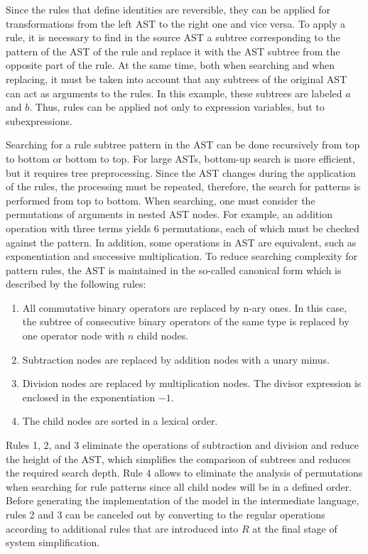 \documentclass[lettersize,journal]{IEEEtran}
\begin{document}
Since the rules that define identities are reversible, they can be applied for transformations from the left AST to the right one and vice versa. 
To apply a rule, it is necessary to find in the source AST a subtree corresponding to the pattern of the AST of the rule and replace it
with the AST subtree from the opposite part of the rule. At the same time, both when searching and when replacing, it must be taken into account that any subtrees 
of the original AST can act as arguments to the rules. In this example, these subtrees are labeled \(a\) and \(b\). Thus, rules can be applied not only to 
expression variables, but to subexpressions.

Searching for a rule subtree pattern in the AST can be done recursively from top to bottom or bottom to top. For large ASTs, bottom-up search is more efficient, 
but it requires tree preprocessing. Since the AST changes during the application of the rules, the processing must be repeated, therefore, 
the search for patterns is performed from top to bottom. When searching, one must consider the permutations of arguments in nested 
AST nodes. For example, an addition operation with three terms yields 6 permutations, each of which must be checked against the pattern. 
In addition, some operations in AST are equivalent, such as exponentiation and successive multiplication. 
To reduce searching complexity for pattern rules, the AST is maintained in the so-called canonical form which is described by the following rules:

\begin{enumerate}
	\item All commutative binary operators are replaced by n-ary ones. In this case, the subtree of consecutive binary operators of the same type is replaced by one operator node with \(n\) child nodes.
	\item Subtraction nodes are replaced by addition nodes with a unary minus.
	\item Division nodes are replaced by multiplication nodes. The divisor expression is enclosed in the exponentiation \(-1\).
	\item The child nodes are sorted in a lexical order.
\end{enumerate}

Rules 1, 2, and 3 eliminate the operations of subtraction and division and reduce the height of the AST, which simplifies the comparison of subtrees 
and reduces the required search depth. Rule 4 allows to eliminate the analysis of permutations when searching for rule patterns since all child 
nodes will be in a defined order. Before generating the implementation of the model in the intermediate language, rules 2 and 3 can be canceled out by
converting to the regular operations according to additional rules that are introduced into \(R\) at the final stage of system simplification.
\end{document}
